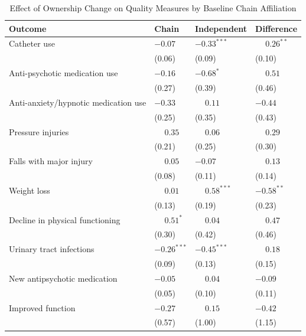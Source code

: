 \begin{table}[!ht]
\centering
\begin{threeparttable}
\caption{Effect of Ownership Change on Quality Measures by Baseline Chain Affiliation}
\label{tab:chain-interaction-quality}
\small
\setlength{\tabcolsep}{6pt}

\begin{tabularx}{\textwidth}{@{} l Y Y Y @{}}
\toprule
Outcome & Chain & Independent & Difference \\
\midrule
Catheter use & $-0.07$ & $-0.33^{***}$ & $\phantom{-}0.26^{**}$ \\
 & (0.06) & (0.09) & (0.10) \\[3pt]
Anti-psychotic medication use & $-0.16$ & $-0.68^{*}$ & $\phantom{-}0.51$ \\
 & (0.27) & (0.39) & (0.46) \\[3pt]
Anti-anxiety/hypnotic medication use & $-0.33$ & $\phantom{-}0.11$ & $-0.44$ \\
 & (0.25) & (0.35) & (0.43) \\[3pt]
Pressure injuries & $\phantom{-}0.35$ & $\phantom{-}0.06$ & $\phantom{-}0.29$ \\
 & (0.21) & (0.25) & (0.30) \\[3pt]
Falls with major injury & $\phantom{-}0.05$ & $-0.07$ & $\phantom{-}0.13$ \\
 & (0.08) & (0.11) & (0.14) \\[3pt]
Weight loss & $\phantom{-}0.01$ & $\phantom{-}0.58^{***}$ & $-0.58^{**}$ \\
 & (0.13) & (0.19) & (0.23) \\[3pt]
Decline in physical functioning & $\phantom{-}0.51^{*}$ & $\phantom{-}0.04$ & $\phantom{-}0.47$ \\
 & (0.30) & (0.42) & (0.46) \\[3pt]
Urinary tract infections & $-0.26^{***}$ & $-0.45^{***}$ & $\phantom{-}0.18$ \\
 & (0.09) & (0.13) & (0.15) \\[3pt]
New antipsychotic medication & $-0.05$ & $\phantom{-}0.04$ & $-0.09$ \\
 & (0.05) & (0.10) & (0.11) \\[3pt]
Improved function & $-0.27$ & $\phantom{-}0.15$ & $-0.42$ \\
 & (0.57) & (1.00) & (1.15) \\[3pt]
\bottomrule
\end{tabularx}


\end{threeparttable}
\end{table}
